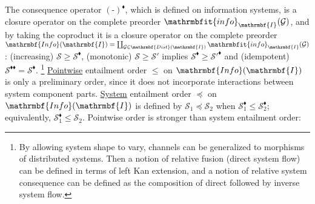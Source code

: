 \documentclass{amsart}
\theoremstyle{remark}
\theoremstyle{definition}
\begin{document}
The consequence operator $(\mbox{-})^{\scriptscriptstyle\blacklozenge}$,
which is defined on information systems,
is a closure operator 
on the complete preorder $\mathrmbfit{info}_{\mathrmbf{I}}(\mathcal{G})$, 
%
%
and by taking the coproduct
it is a closure operator on the complete preorder 
$\mathrmbf{Info}(\mathrmbf{I}) = \coprod_{\mathcal{G} \in \mathrmbf{Dist}(\mathrmbf{I})}\mathrmbfit{info}_{\mathrmbf{I}}(\mathcal{G})$ :
(increasing) $\mathcal{S} \geq \mathcal{S}^{\scriptscriptstyle\blacklozenge}$,
(monotonic)  $\mathcal{S} \geq \mathcal{S}'$ implies $\mathcal{S}^{\scriptscriptstyle\blacklozenge} \geq \mathcal{S}'^{\scriptscriptstyle\blacklozenge}$ and
(idempotent) $\mathcal{S}^{\scriptscriptstyle\blacklozenge\blacklozenge} = \mathcal{S}^{\scriptscriptstyle\blacklozenge}$.
%
\footnote{By allowing system shape to vary,
channels can be generalized to morphisms of distributed systems.
Then a notion of relative fusion (direct system flow) can be defined in terms of left Kan extension,
and a notion of relative system consequence can be defined as 
the composition of direct followed by inverse system flow.}
%
\underline{Pointwise} entailment order $\leq$ on $\mathrmbf{Info}(\mathrmbf{I})$
is only a preliminary order,
since it does not incorporate interactions between system component parts.
\underline{System} entailment order $\preceq$ on $\mathrmbf{Info}(\mathrmbf{I})$
is defined by 
$\mathcal{S}_{1} \preceq \mathcal{S}_{2}$
when
$\mathcal{S}_{1}^{\scriptscriptstyle\blacklozenge} \leq \mathcal{S}_{2}^{\scriptscriptstyle\blacklozenge}$;
equivalently,
$\mathcal{S}_{1}^{\scriptscriptstyle\blacklozenge} \leq \mathcal{S}_{2}$.
Pointwise order is stronger than system entailment order: 
\end{document}
